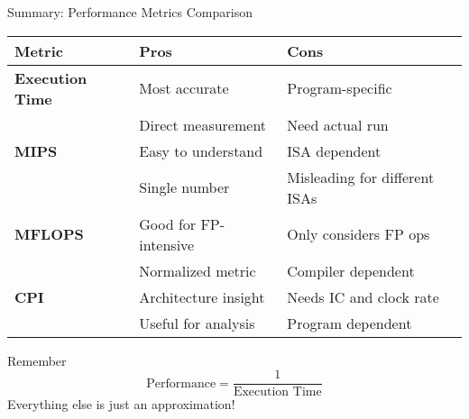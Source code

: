 \documentclass[aspectratio=169,12pt]{beamer}
\begin{document}
\begin{frame}{Summary: Performance Metrics Comparison}
\begin{table}[h]
\centering
\begin{tabular}{lll}
\toprule
\textbf{Metric} & \textbf{Pros} & \textbf{Cons} \\
\midrule
\textbf{Execution Time} & Most accurate & Program-specific \\
& Direct measurement & Need actual run \\
\midrule
\textbf{MIPS} & Easy to understand & ISA dependent \\
& Single number & Misleading for different ISAs \\
\midrule
\textbf{MFLOPS} & Good for FP-intensive & Only considers FP ops \\
& Normalized metric & Compiler dependent \\
\midrule
\textbf{CPI} & Architecture insight & Needs IC and clock rate \\
& Useful for analysis & Program dependent \\
\bottomrule
\end{tabular}
\end{table}

\begin{block}{Remember}
$$\text{Performance} = \frac{1}{\text{Execution Time}}$$
Everything else is just an approximation!
\end{block}
\end{frame}
\end{document}

